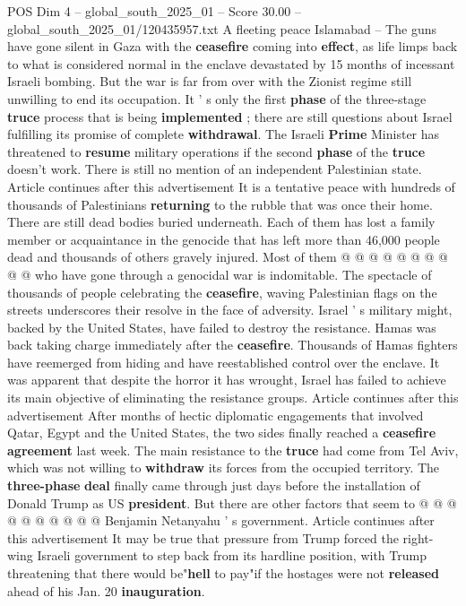 \begin{textsample}{POS Dim 4 – global\_south\_2025\_01 – Score 30.00 – global\_south\_2025\_01/120435957.txt}  \label{ex:f4_pos_003}
A fleeting peace Islamabad -- The guns have gone silent in Gaza with the \textbf{ceasefire} coming into \textbf{effect}, as life limps back to what is considered normal in the enclave devastated by 15 months of incessant Israeli bombing.
But the war is far from over with the Zionist regime still unwilling to end its occupation.
It ' s only the first \textbf{phase} of the three-stage \textbf{truce} process that is being \textbf{implemented} ; there are still questions about Israel fulfilling its promise of complete \textbf{withdrawal}.
The Israeli \textbf{Prime} Minister has threatened to \textbf{resume} military operations if the second \textbf{phase} of the \textbf{truce} doesn't work.
There is still no mention of an independent Palestinian state.
Article continues after this advertisement It is a tentative peace with hundreds of thousands of Palestinians \textbf{returning} to the rubble that was once their home.
There are still dead bodies buried underneath.
Each of them has lost a family member or acquaintance in the genocide that has left more than 46,000 people dead and thousands of others gravely injured.
Most of them @ @ @ @ @ @ @ @ @ @ who have gone through a genocidal war is indomitable.
The spectacle of thousands of people celebrating the \textbf{ceasefire}, waving Palestinian flags on the streets underscores their resolve in the face of adversity.
Israel ' s military might, backed by the United States, have failed to destroy the resistance.
Hamas was back taking charge immediately after the \textbf{ceasefire}.
Thousands of Hamas fighters have reemerged from hiding and have reestablished control over the enclave.
It was apparent that despite the horror it has wrought, Israel has failed to achieve its main objective of eliminating the resistance groups.
Article continues after this advertisement After months of hectic diplomatic engagements that involved Qatar, Egypt and the United States, the two sides finally reached a \textbf{ceasefire} \textbf{agreement} last week.
The main resistance to the \textbf{truce} had come from Tel Aviv, which was not willing to \textbf{withdraw} its forces from the occupied territory.
The \textbf{three-phase} \textbf{deal} finally came through just days before the installation of Donald Trump as US \textbf{president}.
But there are other factors that seem to @ @ @ @ @ @ @ @ @ @ Benjamin Netanyahu ' s government.
Article continues after this advertisement It may be true that pressure from Trump forced the right-wing Israeli government to step back from its hardline position, with Trump threatening that there would be"\textbf{hell} to pay"if the hostages were not \textbf{released} ahead of his Jan. 20 \textbf{inauguration}.

\end{textsample}

